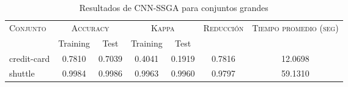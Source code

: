 \begin{table}[]
\centering
\begin{tabular}{l c c c c c c}
\hline
\multirow{2}{*}{\textsc{Conjunto}}
	& \multicolumn{2}{c}{\textsc{Accuracy}}
	& \multicolumn{2}{c}{\textsc{Kappa}}
	& \textsc{Reducción}
	& \textsc{Tiempo promedio (seg)} \\
	& Training & Test
	& Training & Test \\ 
\hline
\hline

credit-card & 0.7810 & 0.7039 & 0.4041 & 0.1919 & 0.7816 & 12.0698 \\
shuttle & 0.9984 & 0.9986 & 0.9963 & 0.9960 & 0.9797 & 59.1310 \\

\hline
\end{tabular}
\caption{Resultados de CNN-SSGA para conjuntos grandes }
\label{res-grande-cnn-ssga}
\end{table}

